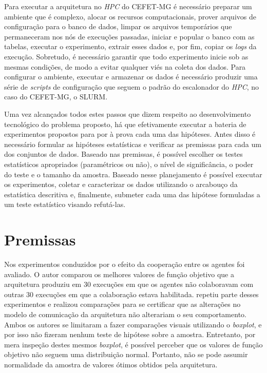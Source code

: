 
Para executar a arquitetura no \textit{HPC} do CEFET-MG é necessário preparar um ambiente que é complexo, alocar os recursos computacionais, prover arquivos de configuração para o banco de dados, limpar os arquivos temporários que permaneceram nos nós de execuções passadas, iniciar e popular o banco com as tabelas, executar o experimento, extrair esses dados e, por fim, copiar os \textit{logs} da execução. Sobretudo, é necessário garantir que todo experimento inicie sob as mesmas condições, de modo a evitar qualquer viés na coleta dos dados. Para configurar o ambiente, executar e armazenar os dados é necessário produzir uma série de \textit{scripts} de configuração que seguem o padrão do escalonador do \textit{HPC}, no caso do CEFET-MG, o SLURM.

Uma vez alcançados todos estes passos que dizem respeito ao desenvolvimento tecnológico do problema proposto, há que efetivamente executar a bateria de experimentos propostos para por à prova cada uma das hipóteses. Antes disso é necessário formular as hipóteses estatísticas e verificar as premissas para cada um dos conjuntos de dados. Baseado nas premissas, é possível escolher os testes estatísticos apropriados (paramétricos ou não), o nível de significância, o poder do teste e o tamanho da amostra. Baseado nesse planejamento é possível executar os experimentos, coletar e caracterizar os dados utilizando o arcabouço da estatística descritiva e, finalmente, submeter cada uma das hipótese formuladas a um teste estatístico visando refutá-las. 

\section{Premissas}
\label{sec:premissas}
Nos experimentos conduzidos por   o efeito da cooperação entre os agentes foi avaliado. O autor comparou os melhores valores de função objetivo que a arquitetura produziu em 30 execuções em que os agentes não colaboravam com outras 30 execuções em que a colaboração estava habilitada.  repetiu parte desses experimentos e realizou comparações para se certificar que as alterações no modelo de comunicação da arquitetura não alterariam o seu comportamento. Ambos os autores se limitaram a fazer comparações visuais utilizando o \textit{boxplot}, e por isso não fizeram nenhum teste de hipótese sobre a amostra. Entretanto, por mera inspeção destes mesmos \textit{boxplot}, é possível perceber que os valores de função objetivo não seguem uma distribuição normal. Portanto, não se pode assumir normalidade da amostra de valores ótimos obtidos pela arquitetura.

